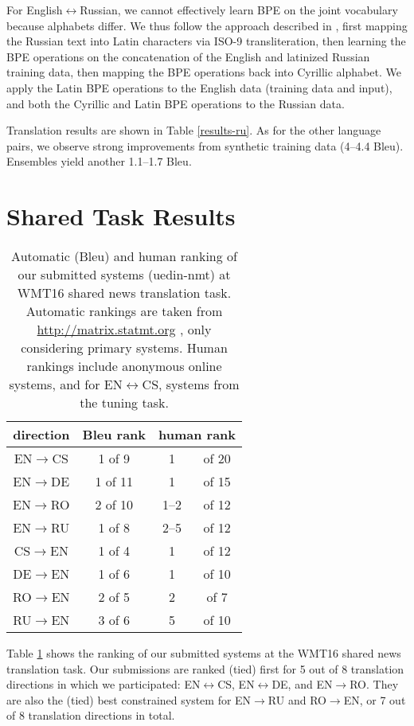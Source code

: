 \documentclass[11pt]{article}
\begin{document}
For English$\leftrightarrow$Russian, we cannot effectively learn BPE on the joint vocabulary because alphabets differ.
We thus follow the approach described in \cite{DBLP:journals/corr/SennrichHB15}, first mapping the Russian text into Latin characters via ISO-9 transliteration,
then learning the BPE operations on the concatenation of the English and latinized Russian training data, then mapping the BPE operations back into Cyrillic alphabet.
We apply the Latin BPE operations to the English data (training data and input), and both the Cyrillic and Latin BPE operations to the Russian data.

Translation results are shown in Table \ref{results-ru}.
As for the other language pairs, we observe strong improvements from synthetic training data (4--4.4 {\sc Bleu}).
Ensembles yield another 1.1--1.7 {\sc Bleu}.


\section{Shared Task Results}

\begin{table}
\centering
\begin{tabular}{c|c|cc}
direction & {\sc Bleu} rank & \multicolumn{2}{c}{human rank}\\
\hline
EN$\to$CS & 1 of \phantom{0}9 & 1 &of 20\\
EN$\to$DE & 1 of 11 & 1 &of 15\\
EN$\to$RO & 2 of 10 & 1--2 &of 12 \\
EN$\to$RU & 1 of \phantom{0}8 & 2--5 &of 12\\
\hline
CS$\to$EN & 1 of \phantom{0}4 & 1 &of 12\\
DE$\to$EN & 1 of \phantom{0}6 & 1 &of 10\\
RO$\to$EN & 2 of \phantom{0}5 & 2 &of \phantom{0}7\\
RU$\to$EN & 3 of \phantom{0}6 & 5 &of 10\\
\end{tabular}
\caption{Automatic ({\sc Bleu}) and human ranking of our submitted systems (uedin-nmt) at WMT16 shared news translation task. Automatic rankings are taken from \url{http://matrix.statmt.org} , only considering primary systems. Human rankings include anonymous online systems, and for EN$\leftrightarrow$CS, systems from the tuning task.}
\label{ranking}
\end{table}

Table \ref{ranking} shows the ranking of our submitted systems at the WMT16 shared news translation task.
Our submissions are ranked (tied) first for 5 out of 8 translation directions in which we participated: EN$\leftrightarrow$CS, EN$\leftrightarrow$DE, and EN$\to$RO.
They are also the (tied) best constrained system for EN$\to$RU and RO$\to$EN, or 7 out of 8 translation directions in total.
\end{document}
